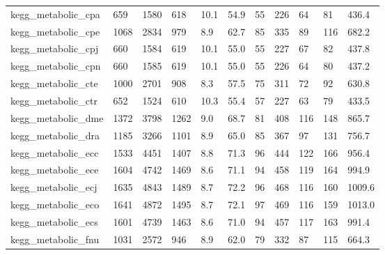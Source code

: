 \begin{longtable}{lllllllllll}
 kegg\_metabolic\_cpa                                 & 659        & 1580      & 618   & 10.1   & 54.9   & 55    & 226    & 64     & 81     & 436.4   \\
 kegg\_metabolic\_cpe                                 & 1068       & 2834      & 979   & 8.9    & 62.7   & 85    & 335    & 89     & 116    & 682.2   \\
 kegg\_metabolic\_cpj                                 & 660        & 1584      & 619   & 10.1   & 55.0   & 55    & 227    & 67     & 82     & 437.8   \\
 kegg\_metabolic\_cpn                                 & 660        & 1585      & 619   & 10.1   & 55.0   & 55    & 226    & 64     & 80     & 437.2   \\
 kegg\_metabolic\_cte                                 & 1000       & 2701      & 908   & 8.3    & 57.5   & 75    & 311    & 72     & 92     & 630.8   \\
 kegg\_metabolic\_ctr                                 & 652        & 1524      & 610   & 10.3   & 55.4   & 57    & 227    & 63     & 79     & 433.5   \\
 kegg\_metabolic\_dme                                 & 1372       & 3798      & 1262  & 9.0    & 68.7   & 81    & 408    & 116    & 148    & 865.7   \\
 kegg\_metabolic\_dra                                 & 1185       & 3266      & 1101  & 8.9    & 65.0   & 85    & 367    & 97     & 131    & 756.7   \\
 kegg\_metabolic\_ecc                                 & 1533       & 4451      & 1407  & 8.8    & 71.3   & 96    & 444    & 122    & 166    & 956.4   \\
 kegg\_metabolic\_ece                                 & 1604       & 4742      & 1469  & 8.6    & 71.1   & 94    & 458    & 119    & 164    & 994.9   \\
 kegg\_metabolic\_ecj                                 & 1635       & 4843      & 1489  & 8.7    & 72.2   & 96    & 468    & 116    & 160    & 1009.6  \\
 kegg\_metabolic\_eco                                 & 1641       & 4872      & 1495  & 8.7    & 72.1   & 97    & 469    & 116    & 159    & 1013.0  \\
 kegg\_metabolic\_ecs                                 & 1601       & 4739      & 1463  & 8.6    & 71.0   & 94    & 457    & 117    & 163    & 991.4   \\
 kegg\_metabolic\_fnu                                 & 1031       & 2572      & 946   & 8.9    & 62.0   & 79    & 332    & 87     & 115    & 664.3   \\

\end{longtable}
